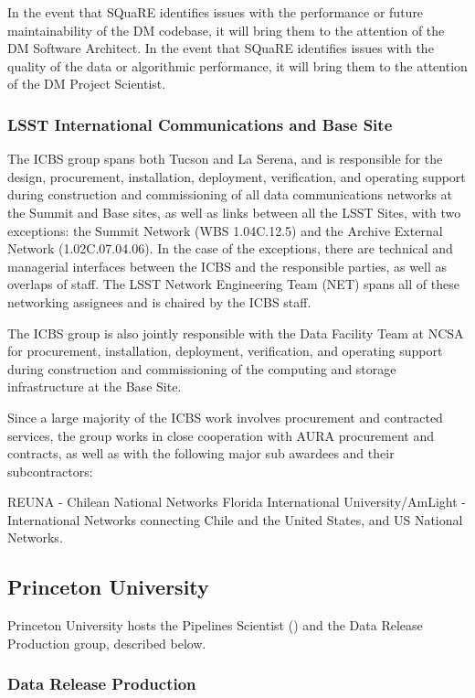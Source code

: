 In the event that SQuaRE identifies issues with the performance or future maintainability of the DM codebase, it will bring them to the attention of the DM Software Architect. In the event that SQuaRE identifies issues with the quality of the data or algorithmic performance, it will bring them to the attention of the DM Project Scientist.

\subsubsection{LSST International Communications and Base Site}
The ICBS group spans both Tucson and La Serena, and is responsible for the design, procurement, installation, deployment, verification, and operating support during construction and commissioning of all data communications networks at the Summit and Base sites, as well as links between all the LSST Sites, with two exceptions:  the Summit Network (WBS 1.04C.12.5) and the Archive External Network (1.02C.07.04.06).  In the case of the exceptions, there are technical and managerial interfaces between the ICBS and the responsible parties, as well as overlaps of staff.  The LSST Network Engineering Team (NET) spans all of these networking assignees and is chaired by the ICBS staff.

The ICBS group is also jointly responsible with the Data Facility Team at NCSA for procurement, installation, deployment, verification, and operating support during construction and commissioning of the computing and storage infrastructure at the Base Site.

Since a large majority of the ICBS work involves procurement and contracted services, the group works in close cooperation with AURA procurement and contracts, as well as with the following major sub awardees and their subcontractors:

REUNA - Chilean National Networks
Florida International University/AmLight - International Networks connecting Chile and the United States, and US National Networks.

\subsection {Princeton University \label{sect:princeton}}

Princeton University hosts the Pipelines Scientist () and the Data Release Production group, described below.

\subsubsection{Data Release Production \label{sect:drp}}

